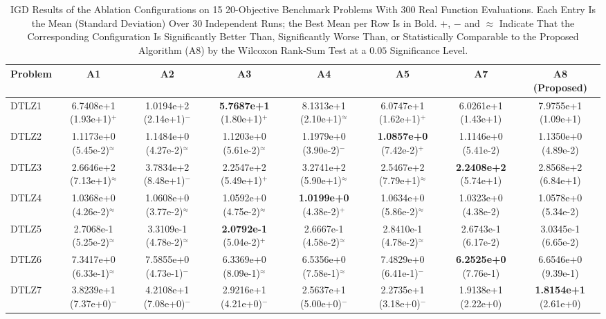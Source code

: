 \begin{table}[!t]
\centering
\caption{IGD Results of the Ablation Configurations on 15 20-Objective
Benchmark Problems With 300 Real Function Evaluations. Each Entry Is the Mean
(Standard Deviation) Over 30 Independent Runs; the Best Mean per Row Is in Bold.
$+$, $-$ and $\approx$ Indicate That the Corresponding Configuration Is
Significantly Better Than, Significantly Worse Than, or Statistically
Comparable to the Proposed Algorithm (A8) by the Wilcoxon Rank-Sum Test at
a $0.05$ Significance Level.}
\label{tab:abl_igd_m20}
\renewcommand{\arraystretch}{1.1}
\setlength{\tabcolsep}{3pt}
\footnotesize
\begin{tabular}{lccccccc}
\toprule
Problem & A1 & A2 & A3 & A4 & A5 & A7 & A8 (Proposed) \\
\midrule
DTLZ1 & 6.7408e+1 (1.93e+1)$^{+}$ & 1.0194e+2 (2.14e+1)$^{-}$ & \textbf{5.7687e+1} (1.80e+1)$^{+}$ & 8.1313e+1 (2.10e+1)$^{\approx}$ & 6.0747e+1 (1.62e+1)$^{+}$ & 6.0261e+1 (1.43e+1) & 7.9755e+1 (1.09e+1) \\
DTLZ2 & 1.1173e+0 (5.45e-2)$^{\approx}$ & 1.1484e+0 (4.27e-2)$^{\approx}$ & 1.1203e+0 (5.61e-2)$^{\approx}$ & 1.1979e+0 (3.90e-2)$^{-}$ & \textbf{1.0857e+0} (7.42e-2)$^{+}$ & 1.1146e+0 (5.41e-2) & 1.1350e+0 (4.89e-2) \\
DTLZ3 & 2.6646e+2 (7.13e+1)$^{\approx}$ & 3.7834e+2 (8.48e+1)$^{-}$ & 2.2547e+2 (5.49e+1)$^{+}$ & 3.2741e+2 (5.90e+1)$^{\approx}$ & 2.5467e+2 (7.79e+1)$^{\approx}$ & \textbf{2.2408e+2} (5.74e+1) & 2.8568e+2 (6.84e+1) \\
DTLZ4 & 1.0368e+0 (4.26e-2)$^{\approx}$ & 1.0608e+0 (3.77e-2)$^{\approx}$ & 1.0592e+0 (4.75e-2)$^{\approx}$ & \textbf{1.0199e+0} (4.38e-2)$^{+}$ & 1.0634e+0 (5.86e-2)$^{\approx}$ & 1.0323e+0 (4.38e-2) & 1.0578e+0 (5.34e-2) \\
DTLZ5 & 2.7068e-1 (5.25e-2)$^{\approx}$ & 3.3109e-1 (4.78e-2)$^{\approx}$ & \textbf{2.0792e-1} (5.04e-2)$^{+}$ & 2.6667e-1 (4.58e-2)$^{\approx}$ & 2.8410e-1 (4.78e-2)$^{\approx}$ & 2.6743e-1 (6.17e-2) & 3.0345e-1 (6.65e-2) \\
DTLZ6 & 7.3417e+0 (6.33e-1)$^{\approx}$ & 7.5855e+0 (4.73e-1)$^{-}$ & 6.3369e+0 (8.09e-1)$^{\approx}$ & 6.5356e+0 (7.58e-1)$^{\approx}$ & 7.4829e+0 (6.41e-1)$^{-}$ & \textbf{6.2525e+0} (7.76e-1) & 6.6546e+0 (9.39e-1) \\
DTLZ7 & 3.8239e+1 (7.37e+0)$^{-}$ & 4.2108e+1 (7.08e+0)$^{-}$ & 2.9216e+1 (4.21e+0)$^{-}$ & 2.5637e+1 (5.00e+0)$^{-}$ & 2.2735e+1 (3.18e+0)$^{-}$ & 1.9138e+1 (2.22e+0) & \textbf{1.8154e+1} (2.61e+0) \\

\end{tabular}
\end{table}
